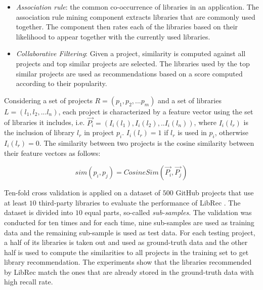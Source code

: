 \begin{itemize}
	\item \textit{Association rule}: the common co-occurrence of libraries in an application. The association rule mining component extracts libraries that are commonly used together. The component then rates each of the libraries based on their likelihood to appear together with the currently used libraries.
	\item \textit{Collaborative Filtering}: Given a project, similarity is computed against all projects and top similar projects are selected. The libraries used by the top similar projects are used as recommendations based on a score computed according to their popularity. 
\end{itemize}

Considering a set of projects $R=(p_{1},p_{2},...p_{m})$ and a set of libraries $L=(l_{1},l_{2},...l_{n})$, each project is characterized by a feature vector using the set of libraries it includes, i.e. $\vec{P_{i}}=(I_{i}(l_{1}),I_{i}(l_{2}),..I_{i}(l_{n}))$, where $I_{i}(l_{r})$ is the inclusion of library $l_{r}$ in project $p_{i}$. $I_{i}(l_{r})=1$ if $l_{r}$ is used in $p_{i}$, otherwise $I_{i}(l_{r})=0$. The similarity between two projects is the cosine similarity between their feature vectors as follows:


\begin{equation}
sim(p_{i},p_{j})=CosineSim(\vec{P_{i}},\vec{P_{j}})
\end{equation}


Ten-fold cross validation is applied on a dataset of $500$ GitHub projects that use at least $10$ third-party libraries to evaluate the performance of LibRec \cite{6671293}. The dataset is divided into $10$ equal parts, so-called \emph{sub-samples}. The validation was conducted for ten times and for each time, nine sub-samples are used as training data and the remaining sub-sample is used as test data. For each testing project, a half of its libraries is taken out and used as ground-truth data and the other half is used to compute the similarities to all projects in the training set to get library recommendation. The experiments show that the libraries recommended by LibRec match the ones that are already stored in the ground-truth data with high recall rate.


